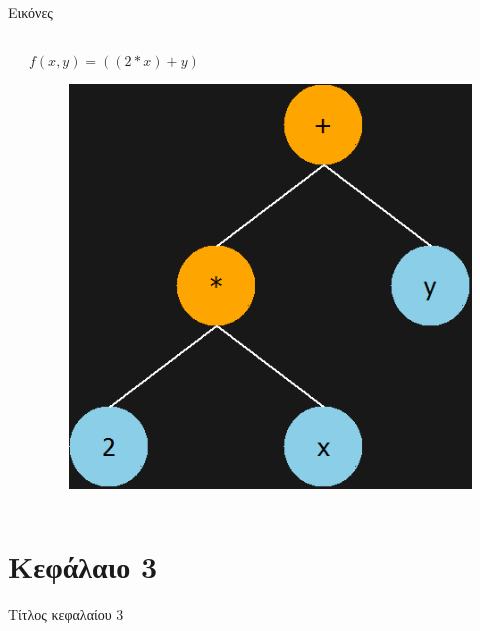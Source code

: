 \documentclass[12pt,t,aspectratio=169,xcolor=table]{beamer}
\begin{document}
\begin{frame}{Εικόνες}
\begin{columns}[T]
\begin{column}{.5\textwidth}
\end{column}%
\hfill%
\begin{column}{.5\textwidth}
\centering
$f(x,y)=((2*x)+y)$
\bigskip
	\begin{figure}[h!]
		\includegraphics[scale=0.3]{expression_tree_example}
	\end{figure}

\end{column}%
\end{columns}	
\end{frame}

\section{Κεφάλαιο 3}
\begin{frame}[plain,c]
\begin{center}
\Huge Τίτλος κεφαλαίου 3
\end{center}
\end{frame}
\end{document}
